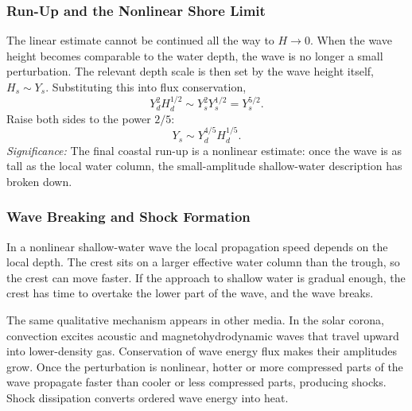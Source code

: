 \subsubsection*{Run-Up and the Nonlinear Shore Limit}
The linear estimate cannot be continued all the way to $H\to0$. When the wave
height becomes comparable to the water depth, the wave is no longer a small
perturbation. The relevant depth scale is then set by the wave height itself,
$H_s\sim Y_s$. Substituting this into flux conservation,
\begin{equation}
    Y_d^2H_d^{1/2}\sim Y_s^2Y_s^{1/2}=Y_s^{5/2}.
    \label{eq:lec11:runup-step}
\end{equation}
Raise both sides to the power $2/5$:
\begin{equation}
    \boxed{
    Y_s\sim Y_d^{4/5}H_d^{1/5}.
    }
    \label{eq:lec11:runup}
\end{equation}
\textit{Significance:} The final coastal run-up is a nonlinear estimate: once
the wave is as tall as the local water column, the small-amplitude shallow-water
description has broken down.


\subsubsection*{Wave Breaking and Shock Formation}
In a nonlinear shallow-water wave the local propagation speed depends on the
local depth. The crest sits on a larger effective water column than the trough,
so the crest can move faster. If the approach to shallow water is gradual enough,
the crest has time to overtake the lower part of the wave, and the wave breaks.

The same qualitative mechanism appears in other media. In the solar corona,
convection excites acoustic and magnetohydrodynamic waves that travel upward
into lower-density gas. Conservation of wave energy flux makes their amplitudes
grow. Once the perturbation is nonlinear, hotter or more compressed parts of the
wave propagate faster than cooler or less compressed parts, producing shocks.
Shock dissipation converts ordered wave energy into heat.

